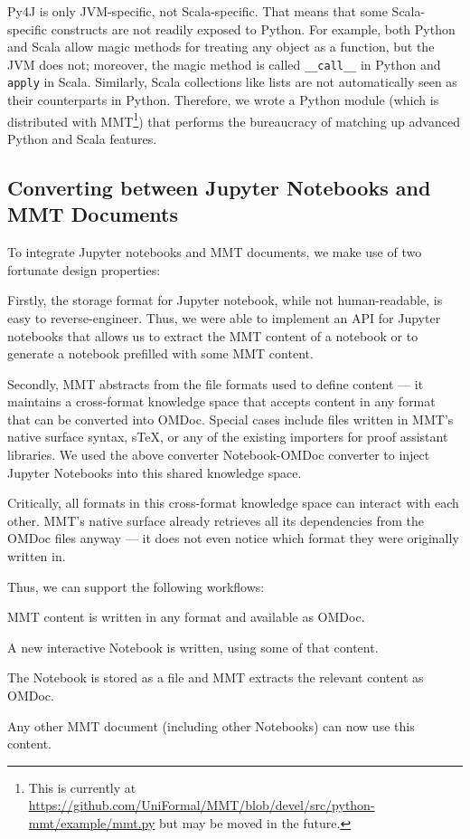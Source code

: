 Py4J is only JVM-specific, not Scala-specific.
That means that some Scala-specific constructs are not readily exposed to Python.
For example, both Python and Scala allow magic methods for treating any object as a function, but the JVM does not; moreover, the magic method is called \texttt{\_\_call\_\_} in Python and \texttt{apply} in Scala.
Similarly, Scala collections like lists are not automatically seen as their counterparts in Python.
Therefore, we wrote a Python module (which is distributed with MMT\footnote{This is currently at \url{https://github.com/UniFormal/MMT/blob/devel/src/python-mmt/example/mmt.py} but may be moved in the future.}) that performs the bureaucracy of matching up advanced Python and Scala features.

\subsection{Converting between Jupyter Notebooks and MMT Documents}


To integrate Jupyter notebooks and MMT documents, we make use of two fortunate design properties:

Firstly, the storage format for Jupyter notebook, while not human-readable, is easy to reverse-engineer.
Thus, we were able to implement an API for Jupyter notebooks that allows us to extract the MMT content of a notebook or to generate a notebook prefilled with some MMT content.

Secondly, MMT abstracts from the file formats used to define content --- it maintains a cross-format knowledge space that accepts content in any format that can be converted into OMDoc.
Special cases include files written in MMT's native surface syntax, sTeX, or any of the existing importers for proof assistant libraries.
We used the above converter Notebook-OMDoc converter to inject Jupyter Notebooks into this shared knowledge space.

Critically, all formats in this cross-format knowledge space can interact with each other.
MMT's native surface already retrieves all its dependencies from the OMDoc files anyway --- it does not even notice which format they were originally written in.

Thus, we can support the following workflows:
\begin{compactenum}
 \item MMT content is written in any format and available as OMDoc.
 \item A new interactive Notebook is written, using some of that content.
 \item The Notebook is stored as a file and MMT extracts the relevant content as OMDoc.
 \item Any other MMT document (including other Notebooks) can now use this content.
\end{compactenum}

